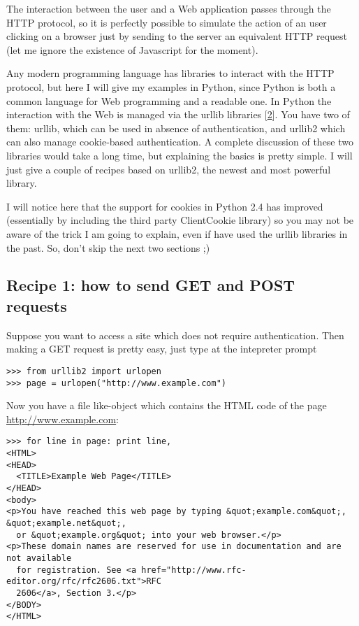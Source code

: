 \documentclass[10pt,a4paper,english]{article}
\begin{document}
The interaction between the user and a Web application
passes through the HTTP protocol, so it is perfectly possible
to simulate the action of an user clicking on a browser
just by sending to the server an equivalent HTTP request (let me
ignore the existence of Javascript for the moment).

Any modern programming language has libraries to interact with the 
HTTP protocol, but here I will give my examples in Python, since Python 
is both a common language for Web programming and a readable one. In Python 
the interaction with the Web is managed via the urllib libraries [\hyperlink{id12}{2}].
You have two of them: urllib, which can be used in absence of authentication,
and urllib2 which can also manage cookie-based authentication. A complete
discussion of these two libraries would take a long
time, but explaining the basics is pretty simple. I will just give
a couple of recipes based on urllib2, the newest and most powerful library.

I will notice here that the support for cookies in Python 2.4
has improved (essentially by including the third party ClientCookie
library) so you may not be aware of the trick I am going to explain, even 
if have used the urllib libraries in the past. So, don't skip the
next two sections ;)



\hypertarget{recipe-1-how-to-send-get-and-post-requests}{}
\subsection*{Recipe 1: how to send GET and POST requests}

Suppose you want to access a site which does not require authentication.
Then making a GET request is pretty easy, just type at the intepreter
prompt
\begin{verbatim}>>> from urllib2 import urlopen
>>> page = urlopen("http://www.example.com")\end{verbatim}

Now you have a file like-object which contains the HTML code
of the page \href{http://www.example.com}{http://www.example.com}:
\begin{verbatim}>>> for line in page: print line,
<HTML>
<HEAD>
  <TITLE>Example Web Page</TITLE>
</HEAD> 
<body>  
<p>You have reached this web page by typing &quot;example.com&quot;,
&quot;example.net&quot;,
  or &quot;example.org&quot; into your web browser.</p>
<p>These domain names are reserved for use in documentation and are not available 
  for registration. See <a href="http://www.rfc-editor.org/rfc/rfc2606.txt">RFC 
  2606</a>, Section 3.</p>
</BODY>
</HTML>\end{verbatim}
\end{document}
